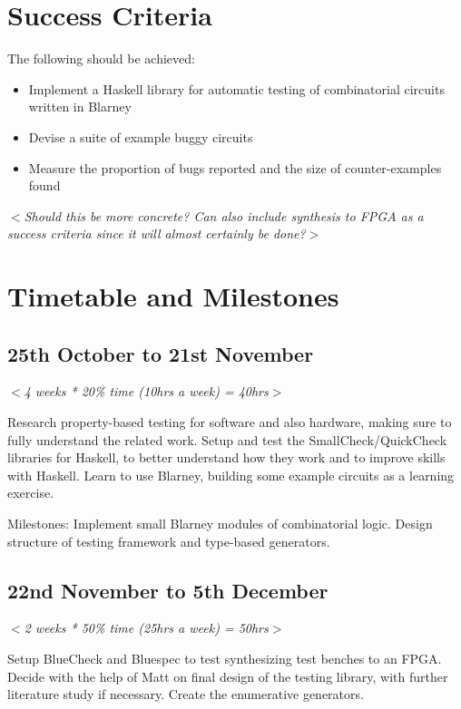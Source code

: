 \documentclass[UKenglish, 12pt]{article}
\newcommand{\al}{$<$}
\newcommand{\ar}{$>$}
\begin{document}
\section*{Success Criteria}

The following should be achieved:

\begin{itemize}

\item Implement a Haskell library for automatic testing of combinatorial circuits written in Blarney

\item Devise a suite of example buggy circuits

\item Measure the proportion of bugs reported and the size of counter-examples found

\end{itemize}
\al\emph{Should this be more concrete? Can also include synthesis to FPGA as a
success criteria since it will almost certainly be done?}\ar


\section*{Timetable and Milestones}

\subsection*{25th October to 21st November}

\al\emph{4 weeks * 20\% time (10hrs a week) = 40hrs}\ar

Research property-based testing for software and also hardware, making sure to
fully understand the related work. Setup and test the SmallCheck/QuickCheck
libraries for Haskell, to better understand how they work and to improve skills
with Haskell.
Learn to use Blarney, building some example circuits as a learning exercise.

Milestones: Implement small Blarney modules of combinatorial logic.  Design
structure of testing framework and type-based generators.


\subsection*{22nd November to 5th December}
\al\emph{2 weeks * 50\% time (25hrs a week) = 50hrs}\ar

Setup BlueCheck and Bluespec to test synthesizing test benches to an
FPGA.
Decide with the help of Matt on final design of the testing library, with
further literature study if necessary. Create the enumerative generators.
\end{document}
